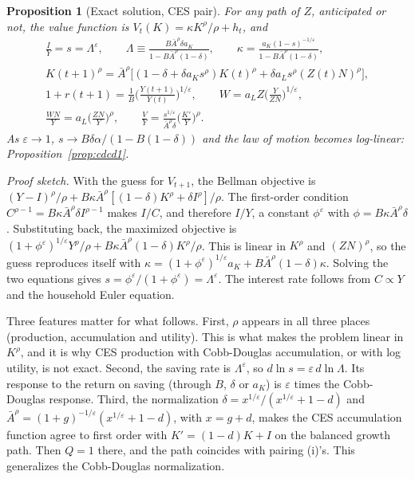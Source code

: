 \documentclass[11pt]{article}
\newtheorem{proposition}{Proposition}
\newcommand{\e}{\varepsilon}
\begin{document}
\begin{proposition}[Exact solution, CES pair]\label{prop:cesces1}
For any path of $Z$, anticipated or not, the value function is
$V_t(K)=\kappa K^\rho/\rho+h_t$, and
\begin{gather*}
\frac IY=s=\Lambda^{\e},\qquad
\Lambda\equiv\frac{B\bar A^\rho\delta a_K}{1-B\bar A^\rho(1-\delta)},\qquad
\kappa=\frac{a_K(1-s)^{-1/\e}}{1-B\bar A^\rho(1-\delta)},\\
K(t+1)^\rho=\bar A^\rho\big[(1-\delta+\delta a_Ks^\rho)K(t)^\rho+\delta a_Ls^\rho(Z(t)N)^\rho\big],\\
1+r(t+1)=\frac1B\Big(\frac{Y(t+1)}{Y(t)}\Big)^{1/\e},\qquad
W=a_LZ\Big(\frac{Y}{ZN}\Big)^{1/\e},\\
\frac{WN}{Y}=a_L\Big(\frac{ZN}{Y}\Big)^{\rho},\qquad
\frac VY=\frac{s^{1/\e}}{\bar A^\rho\delta}\Big(\frac{K'}{Y}\Big)^{\rho}.
\end{gather*}
As $\e\to1$, $s\to B\delta\alpha/(1-B(1-\delta))$ and the law of motion becomes log-linear:
Proposition~\ref{prop:cdcd1}.
\end{proposition}
\emph{Proof sketch.} With the guess for $V_{t+1}$, the Bellman objective is
$(Y-I)^\rho/\rho+B\kappa\bar A^\rho[(1-\delta)K^\rho+\delta I^\rho]/\rho$. The first-order condition
$C^{\rho-1}=B\kappa\bar A^\rho\delta I^{\rho-1}$ makes $I/C$, and therefore $I/Y$, a constant
$\phi^{\e}$ with $\phi=B\kappa\bar A^\rho\delta$. Substituting back, the maximized objective is
$(1+\phi^\e)^{1/\e}Y^\rho/\rho+B\kappa\bar A^\rho(1-\delta)K^\rho/\rho$. This is linear in $K^\rho$
and $(ZN)^\rho$, so the guess reproduces itself with
$\kappa=(1+\phi^\e)^{1/\e}a_K+B\bar A^\rho(1-\delta)\kappa$. Solving the two equations gives
$s=\phi^\e/(1+\phi^\e)=\Lambda^\e$. The interest rate follows from $C\propto Y$ and the
household Euler equation.

Three features matter for what follows. First, $\rho$ appears in all three places
(production, accumulation and utility). This is what makes the problem linear in
$K^\rho$, and it is why CES production with Cobb-Douglas accumulation, or with log
utility, is not exact. Second, the saving rate is $\Lambda^\e$, so
$d\ln s=\e\,d\ln\Lambda$. Its response to the return on saving (through $B$, $\delta$ or $a_K$)
is $\e$ times the Cobb-Douglas response. Third, the normalization
$\delta=x^{1/\e}/(x^{1/\e}+1-d)$ and $\bar A^\rho=(1+g)^{-1/\e}(x^{1/\e}+1-d)$, with $x=g+d$,
makes the CES accumulation function agree to first order with $K'=(1-d)K+I$ on the
balanced growth path. Then $Q=1$ there, and the path coincides with pairing (i)'s. This
generalizes the Cobb-Douglas normalization.
\end{document}
